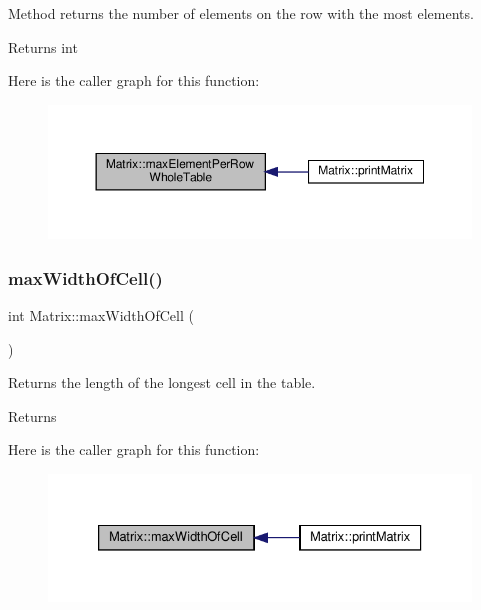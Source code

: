 Method returns the number of elements on the row with the most elements. \begin{DoxyReturn}{Returns}
int 
\end{DoxyReturn}
Here is the caller graph for this function\+:\nopagebreak
\begin{figure}[H]
\begin{center}
\leavevmode
\includegraphics[width=350pt]{class_matrix_a8620c5426a31cf8fe0072df32bb3f65d_icgraph}
\end{center}
\end{figure}
\mbox{\label{class_matrix_a60dac9b70e73a12d2adb32d6be9ff65d}} 
\subsubsection{\texorpdfstring{max\+Width\+Of\+Cell()}{maxWidthOfCell()}}
{\footnotesize\ttfamily int Matrix\+::max\+Width\+Of\+Cell (\begin{DoxyParamCaption}{ }\end{DoxyParamCaption})\hspace{0.3cm}{\ttfamily [private]}}

Returns the length of the longest cell in the table. \begin{DoxyReturn}{Returns}

\end{DoxyReturn}
Here is the caller graph for this function\+:\nopagebreak
\begin{figure}[H]
\begin{center}
\leavevmode
\includegraphics[width=333pt]{class_matrix_a60dac9b70e73a12d2adb32d6be9ff65d_icgraph}
\end{center}
\end{figure}
\mbox{\label{class_matrix_aa1967ad240a5ffaf492800044b7275d9}} 
